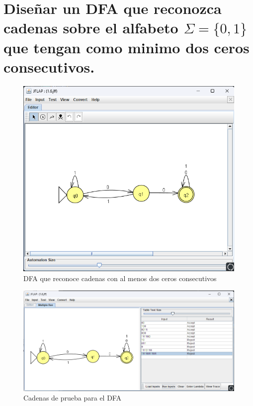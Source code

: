 \documentclass[11pt]{report}
\begin{document}
\section{Diseñar un DFA que reconozca cadenas sobre el alfabeto $\Sigma = \{0, 1\}$ que tengan como minimo dos ceros consecutivos.}
\begin{figure}[H]
  \centering
  \includegraphics[scale=0.6]{img/DFA_06.png}
  \caption{DFA que reconoce cadenas con al menos dos ceros consecutivos}
\end{figure}

\begin{figure}[H]
  \centering
  \includegraphics[scale=0.65]{img/DFA_06_test.png}
  \caption{Cadenas de prueba para el DFA}
\end{figure}

\newpage
\end{document}
